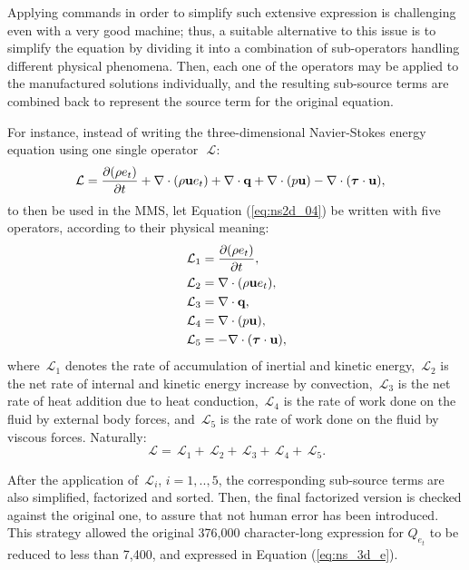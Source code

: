 \documentclass[10pt]{article}
\newcommand{\Diff}[2] {\dfrac{\partial( #1)}{\partial #2}}
\newcommand{\bv}[1]{\ensuremath{\mbox{\boldmath$ #1 $}}}
\newcommand{\Lo}{\,\mathcal{L}}
\begin{document}
Applying commands in order to simplify such extensive expression is challenging even with a very good machine; thus, a suitable alternative to this issue is to simplify the equation by dividing it into a combination of sub-operators handling different physical phenomena. Then, each one of the operators may be applied to the manufactured solutions individually, and the resulting sub-source terms are combined back to represent the source term for the original equation.



For instance, instead of writing the three-dimensional Navier-Stokes energy equation using one single operator~$\Lo$:
\begin{equation}
 \label{eq:ns2d_04}
\begin{split}
\Lo= \Diff{\rho e_t}{t}&+\nabla \cdot (\rho\mathbf{u}e_t) +\nabla\cdot \mathbf{q} +  \nabla\cdot(p  \mathbf{u})  - \nabla \cdot (\bv{\tau} \cdot \mathbf{u}),
\end{split}
\end{equation}
to then be used in the MMS, let Equation (\ref{eq:ns2d_04}) be written with five operators, according to their physical meaning:
\begin{equation}
 \begin{split}
  \Lo_1&=\Diff{\rho e_t}{t} ,\\
  \Lo_2&=\nabla \cdot (\rho\mathbf{u}e_t),\\
  \Lo_3&=\nabla\cdot \mathbf{q},\\
  \Lo_4&= \nabla\cdot(p  \mathbf{u}),\\
  \Lo_5&=- \nabla \cdot (\bv{\tau} \cdot \mathbf{u}),
 \end{split}
\end{equation}
where $\Lo_1$ denotes the rate of accumulation of inertial and kinetic energy, $\Lo_2$ is the net rate of internal and kinetic energy increase by convection, $\Lo_3$ is the net rate of heat addition due to heat conduction, $\Lo_4$ is the rate of work done on the fluid by external body forces, and $\Lo_5$ is the rate of work done on the fluid by viscous forces. Naturally:
$$\Lo=\Lo_1+\Lo_2+\Lo_3+\Lo_4+\Lo_5.$$


 After the application of $\Lo_i$, $i=1,..,5$, the corresponding sub-source terms are also simplified, factorized and sorted. Then, the final factorized version is checked against the original one, to assure that not human error has been introduced.  This strategy allowed the original  376,000 character-long  expression for $Q_{e_t}$ to be reduced to less than 7,400, and expressed in Equation (\ref{eq:ns_3d_e}).
\end{document}
